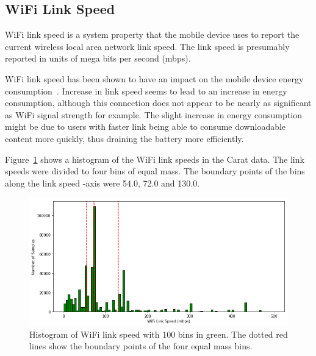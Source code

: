 \subsection{WiFi Link Speed}

WiFi link speed is a system property that the mobile device uses to report the current wireless local area network link speed. The link speed is presumably reported in units of mega bits per second (mbps). 

WiFi link speed has been shown to have an impact on the mobile device energy consumption~\cite{7146507, 5375354}. Increase in link speed seems to lead to an increase in energy consumption, although this connection does not appear to be nearly as significant as WiFi signal strength for example. The slight increase in energy consumption might be due to users with faster link being able to consume downloadable content more quickly, thus draining the battery more efficiently.

Figure~\ref{figure:carat-data-wifi-speed} shows a histogram of the WiFi link speeds in the Carat data. The link speeds were divided to four bins of equal mass. The boundary points of the bins along the link speed -axis were 54.0, 72.0 and 130.0. 

\begin{figure} %
	\centering
	\includegraphics[width=\textwidth]{images/carat-data/wifi_speed_w_boundaries.png}
	\caption{Histogram of WiFi link speed with 100 bins in green. The dotted red lines show the boundary points of the four equal mass bins.}
	\label{figure:carat-data-wifi-speed}
\end{figure}
